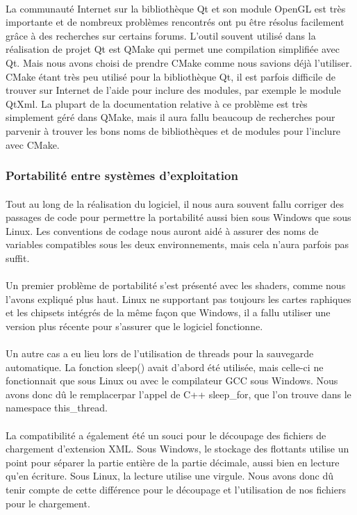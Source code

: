 \paragraph{}
La communauté Internet sur la bibliothèque Qt et son module OpenGL est très importante et de nombreux problèmes rencontrés ont pu être résolus facilement grâce à des recherches sur certains forums. 
L'outil souvent utilisé dans la réalisation de projet Qt est QMake qui permet une compilation simplifiée avec Qt. Mais nous avons choisi de prendre CMake comme nous savions déjà l'utiliser.
CMake étant très peu utilisé pour la bibliothèque Qt, il est parfois difficile de trouver sur Internet de l'aide pour inclure des modules, par exemple le module QtXml. La plupart de la documentation relative à ce problème est très simplement géré dans QMake, mais il aura fallu beaucoup de recherches pour parvenir à trouver les bons noms de bibliothèques et de modules pour l'inclure avec CMake.

\subsubsection{Portabilité entre systèmes d'exploitation}
\paragraph{}
Tout au long de la réalisation du logiciel, il nous aura souvent fallu corriger des passages de code pour permettre la portabilité aussi bien sous Windows que sous Linux. Les conventions de codage nous auront aidé à assurer des noms de variables compatibles sous les deux environnements, mais cela n'aura parfois pas suffit. 
\paragraph{}
Un premier problème de portabilité s'est présenté avec les shaders, comme nous l'avons expliqué plus haut. Linux ne supportant pas toujours les cartes raphiques et les chipsets intégrés de la même façon que Windows, il a fallu utiliser une version plus récente pour s'assurer que le logiciel fonctionne.

\paragraph{}
Un autre cas a eu lieu lors de l'utilisation de threads pour la sauvegarde automatique. La fonction sleep() avait d'abord été utilisée, mais celle-ci ne fonctionnait que sous Linux ou avec le compilateur GCC sous Windows. Nous avons donc dû le remplacerpar l'appel de C++ sleep\_for, que l'on trouve dans le namespace this\_thread. 

\paragraph{}
La compatibilité a également été un souci pour le découpage des fichiers de chargement d'extension XML. Sous Windows, le stockage des flottants utilise un point pour séparer la partie entière de la partie décimale, aussi bien en lecture qu'en écriture. Sous Linux, la lecture utilise une virgule. Nous avons donc dû tenir compte de cette différence pour le découpage et l'utilisation de nos fichiers pour le chargement.
